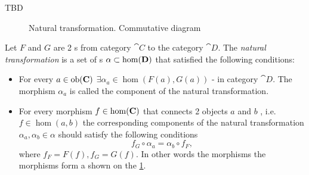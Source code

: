 TBD

\begin{definition}
\label{def:nt}

\begin{figure}
  \centering
  \caption{Natural transformation. Commutative diagram}
  \label{fig:nt_def}
\end{figure}

Let $F$ and $G$ are 2 s from category $\cat{C}$
to the category $\cat{D}$. The \textit{natural transformation} is a
set of s $\alpha \subset \mathrm{hom}(\mathbf{D})$ that
satisfied the following conditions:
\begin{itemize}
\item For every  $a \in \mathrm{ob}(\mathbf{C})$ $\exists
\alpha_a \in \hom\left(F(a), G(a)\right)$ - 
in category $\cat{D}$. The morphism $\alpha_a$ is called the component of
the natural transformation.
\item For every morphism $f \in \mathrm{hom}(\mathbf{C})$ that connects 2 objects
  $a$ and $b$ , i.e. $f \in \hom(a,b)$ the corresponding components of
  the natural transformation $\alpha_a, \alpha_b \in \alpha$ should
  satisfy the following conditions
  \begin{equation}
    f_G \circ \alpha_a = \alpha_b \circ f_F,
    \label{eq:nt_definition}
  \end{equation}
  where $f_F = F(f), f_G = G(f)$.
  In other words the morphisms the morphisms form a
   shown on the \cref{fig:nt_def}. 
\end{itemize}
\end{definition}

